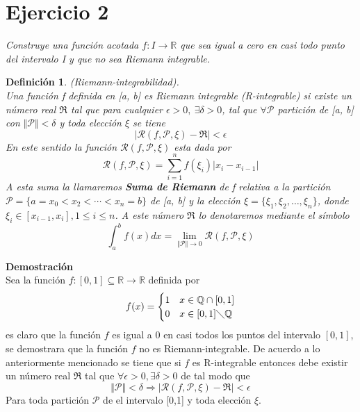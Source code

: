 \documentclass[a4paper,12pt]{article}
\newtheorem{definicion}{Definición}[subsection]
\begin{document}
\section{Ejercicio 2}

\textit{Construye una función acotada $f : I \rightarrow \mathbb{R}$ que sea igual a cero en casi todo punto del intervalo
I y que no sea Riemann integrable.}

\begin{definicion} (Riemann-integrabilidad).\\
Una función f definida en [a, b] es Riemann integrable (R-integrable) si existe
un número real $\mathfrak{R} $ tal que para cualquier $\epsilon > 0, \ \exists \delta > 0$, tal que $\forall \mathcal{P}$
partición de [a, b] con $\Vert \mathcal{P} \Vert < \delta$ y toda elección $\xi$ se tiene
\[\vert \mathcal{R}(f,\mathcal{P},\xi)-\mathfrak{R}\vert < \epsilon\]
En este sentido la función $\mathcal{R}(f,\mathcal{P},\xi)$ esta dada por
\[\mathcal{R}(f,\mathcal{P},\xi) = \sum_{i = 1}^{n} f(\xi_i)\vert x_i - x_{i-1}\vert\]
A esta suma la llamaremos \textbf{Suma de Riemann} de f relativa a la partición
$\mathcal{P} = \lbrace a = x_0 < x_2 < \cdots < x_n = b \rbrace$ de [a, b] y la elección
$\xi = \lbrace \xi_1,\xi_2,\ldots,\xi_n\rbrace$, donde $\xi_i \in [x_{i-1},x_i], 1 \leq i \leq n$.
A este número $\mathfrak{R} $ lo denotaremos mediante el símbolo
\[\int_{a}^{b} f(x) dx = \lim_{\Vert \mathcal{P} \Vert \rightarrow 0} \mathcal{R} (f,\mathcal{P} ,\xi) \]
\end{definicion}

\textbf{Demostración}\\
Sea la función $f : [0,1] \subseteq \mathbb{R} \rightarrow \mathbb{R}$ definida por
\[f(x)=
\begin{cases}
    1 &  x \in \mathbb{Q} \cap [0,1]\\
    0 & x \in [0,1]\diagdown \mathbb{Q}
\end{cases}\]
es claro que la función $f$ es igual a 0 en casi todos los puntos del intervalo $[0,1]$, se demostrara que la función $f$
no es Riemann-integrable.
De acuerdo a lo anteriormente mencionado se tiene que si $f$ es R-integrable entonces debe existir un número real
$\mathfrak{R}$ tal que $\forall \epsilon > 0, \exists \delta >0$ de tal modo que
\[\Vert \mathcal{P} \Vert < \delta \Rightarrow  \vert \mathcal{R} (f,\mathcal{P},\xi) - \mathfrak{R} \vert < \epsilon\]
Para toda partición $\mathcal{P}$ de el intervalo [0,1] y toda elección $\xi$.
\end{document}
